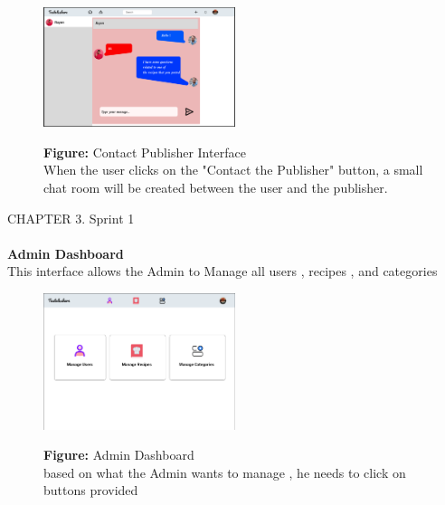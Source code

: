 \documentclass{article}
\begin{document}
{{{{{{{{\begin{figure}[htbp]
    \centering
    \includegraphics[width=0.5\textwidth]{Contact} 
    \vspace{0.5cm}
    
    \textbf{Figure:} Contact Publisher Interface \\
    When the user clicks on the "Contact the Publisher" button, a small chat room will be created between the user and the publisher.
\end{figure}
\newpage

\noindent
CHAPTER 3.  Sprint 1 \\
\underline{\hspace{\textwidth}} \vspace{0.2cm}
\\\textbf{Admin Dashboard}\\
This interface allows the Admin to Manage all users , recipes , and categories
\\
\begin{figure}[htbp]
    \centering
    \includegraphics[width=0.5\textwidth]{AdminInterface} 
    \vspace{0.5cm}
    
    \textbf{Figure:} Admin Dashboard \\
    based on what the Admin wants to manage , he needs to click on buttons provided
\end{figure}





}}}}}}}}
\end{document}
